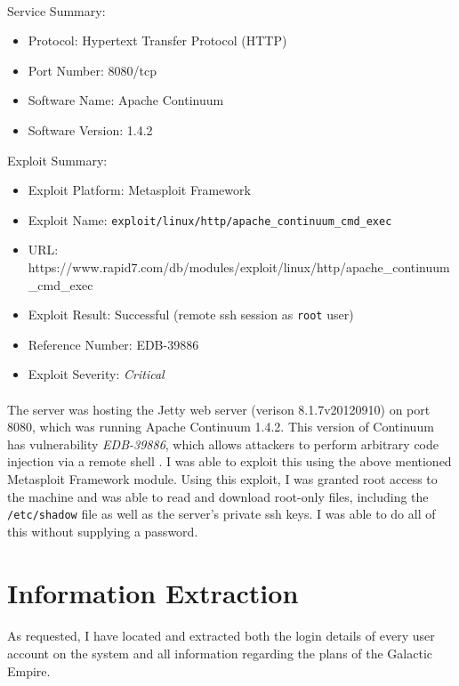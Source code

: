 \documentclass{article}
\begin{document}
\paragraph{}
Service Summary:
\begin{itemize}
	\item Protocol: Hypertext Transfer Protocol (HTTP)
	\item Port Number: 8080/tcp
	\item Software Name: Apache Continuum
	\item Software Version: 1.4.2
\end{itemize}
Exploit Summary:
\begin{itemize}
	\item Exploit Platform: Metasploit Framework
	\item Exploit Name: \texttt{exploit/linux/http/apache\_continuum\_cmd\_exec}
	\item URL: https://www.rapid7.com/db/modules/exploit/linux/http/apache\_continuum\_cmd\_exec
	\item Exploit Result: Successful (remote ssh session as \texttt{root} user)
	\item Reference Number: EDB-39886
	\item Exploit Severity: \emph{Critical}
\end{itemize}

\paragraph{}
The server was hosting the Jetty web server (verison 8.1.7v20120910) on port 8080, which was running Apache Continuum 1.4.2.
This version of Continuum has vulnerability \emph{EDB-39886}, which allows attackers to perform arbitrary code injection via a remote shell \parencite{exploitdb39886}.
I was able to exploit this using the above mentioned Metasploit Framework module.
Using this exploit, I was granted root access to the machine and was able to read and download root-only files, including the \texttt{/etc/shadow} file as well as the server's private ssh keys.
I was able to do all of this without supplying a password.

\newpage

\section{Information Extraction}
\label{sec:info_extraction}
\paragraph{}
As requested, I have located and extracted both the login details of every user account on the system and all information regarding the plans of the Galactic Empire.
\end{document}
